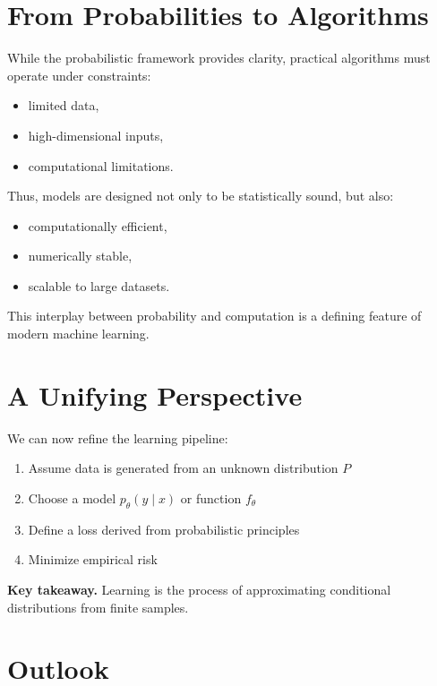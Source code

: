 \section{From Probabilities to Algorithms}

While the probabilistic framework provides clarity, practical algorithms must operate under constraints:
\begin{itemize}
    \item limited data,
    \item high-dimensional inputs,
    \item computational limitations.
\end{itemize}

\medskip

\noindent
Thus, models are designed not only to be statistically sound, but also:
\begin{itemize}
    \item computationally efficient,
    \item numerically stable,
    \item scalable to large datasets.
\end{itemize}

\medskip

\noindent
This interplay between probability and computation is a defining feature of modern machine learning.

\section{A Unifying Perspective}

We can now refine the learning pipeline:

\begin{enumerate}
    \item Assume data is generated from an unknown distribution $P$
    \item Choose a model $p_\theta(y \mid x)$ or function $f_\theta$
    \item Define a loss derived from probabilistic principles
    \item Minimize empirical risk
\end{enumerate}

\medskip

\noindent
\textbf{Key takeaway.}  
Learning is the process of approximating conditional distributions from finite samples.

\section{Outlook}

